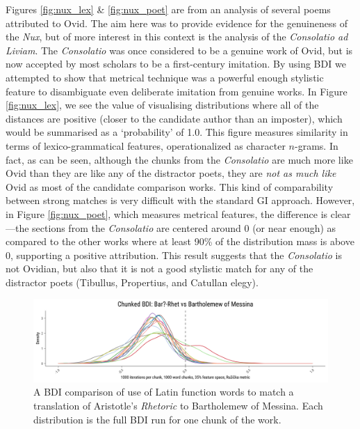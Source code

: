 \documentclass[
    hf
]{ceurart}
\begin{document}
Figures \ref{fig:nux_lex} \& \ref{fig:nux_poet} are from an analysis of several poems attributed to
Ovid. The aim here was to provide evidence for the genuineness of the \emph{Nux}, but of more
interest in this context is the analysis of the \emph{Consolatio ad Liviam}. The \emph{Consolatio}
was once considered to be a genuine work of Ovid, but is now accepted by most scholars to be a
first-century imitation. By using BDI we attempted to show that metrical technique was a powerful
enough stylistic feature to disambiguate even deliberate imitation from genuine works. In Figure
\ref{fig:nux_lex}, we see the value of visualising distributions where all of the distances are
positive (closer to the candidate author than an imposter), which would be summarised as a
`probability' of 1.0. This figure measures similarity in terms of lexico-grammatical features,
operationalized as character $n$-grams. In fact, as can be seen, although the chunks from the
\emph{Consolatio} are much more like Ovid than they are like any of the distractor poets, they are
\emph{not as much like} Ovid as most of the candidate comparison works. This kind of comparability
between strong matches is very difficult with the standard GI approach. However, in Figure
\ref{fig:nux_poet}, which measures metrical features, the difference is clear---the sections from the
\emph{Consolatio} are centered around 0 (or near enough) as compared to the other works where at
least 90\% of the distribution mass is above 0, supporting a positive attribution. This result
suggests that the \emph{Consolatio} is not Ovidian, but also that it is not a good stylistic match
for any of the distractor poets (Tibullus, Propertius, and Catullan elegy).

\begin{figure}
    \includegraphics[width=\linewidth]{figures/bdi_bar_paper.png}
    \caption{A BDI comparison of use of Latin function words to match a
        translation of Aristotle's \emph{Rhetoric} to Bartholemew of Messina. Each
        distribution is the full BDI run for one chunk of the work.}
    \label{fig:trans_bar}
\end{figure}
\end{document}
